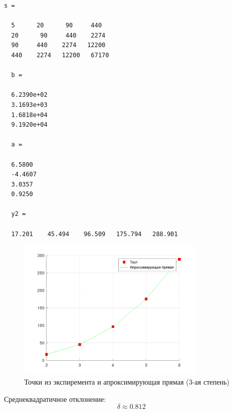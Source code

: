 \begin{lstlisting}[backgroundcolor=\color{cyan}]
  s =

  5      20      90     440
  20      90     440    2274
  90     440    2274   12200
  440    2274   12200   67170

  b =

  6.2390e+02
  3.1693e+03
  1.6818e+04
  9.1920e+04

  a =

  6.5800
  -4.4607
  3.0357
  0.9250

  y2 =

  17.201    45.494    96.509   175.794   288.901
\end{lstlisting}
\begin{figure}[H]
  \caption{Точки из экспиремента и апроксимирующая прямая (3-ая степень)}
  \label{fig:plot_7_3}
  \centering
  \includegraphics[width=0.8\textwidth]{images/task_7_3.png}
\end{figure}
Среднеквадратичное отклонение:
\[
  \delta \approx 0.812
\]
